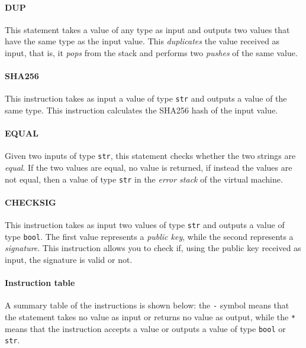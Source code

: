 \paragraph{DUP}

This statement takes a value of any type as input and outputs two values that have the same type as the 
input value. This \textit{duplicates} the value received as input, that is, it \textit{pops} from the 
stack and performs two \textit{pushes} of the same value.

\paragraph{SHA256}

This instruction takes as input a value of type \verb|str| and outputs a value of the same type. This 
instruction calculates the SHA256 hash of the input value.

\paragraph{EQUAL}

Given two inputs of type \verb|str|, this statement checks whether the two strings are \textit{equal}. If 
the two values are equal, no value is returned, if instead the values are not equal, then a value of type 
\verb|str| in the \textit{error stack} of the virtual machine.

\paragraph{CHECKSIG}

This instruction takes as input two values of type \verb|str| and outputs a value of type \verb|bool|. The 
first value represents a \textit{public key}, while the second represents a \textit{signature}. This 
instruction allows you to check if, using the public key received as input, the signature is valid or not.

\paragraph{Instruction table}

A summary table of the instructions is shown below: the \verb|-| symbol means that the statement takes no 
value as input or returns no value as output, while the \verb|*| means that the instruction accepts a 
value or outputs a value of type \verb|bool| or \verb|str|.

